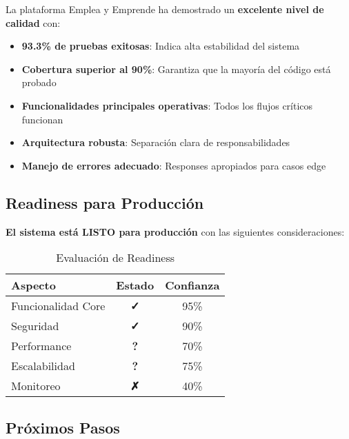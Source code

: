 \documentclass[12pt,a4paper]{article}
\begin{document}
La plataforma Emplea y Emprende ha demostrado un \textcolor{successgreen}{\textbf{excelente nivel de calidad}} con:

\begin{itemize}
    \item \textbf{93.3\% de pruebas exitosas}: Indica alta estabilidad del sistema
    \item \textbf{Cobertura superior al 90\%}: Garantiza que la mayoría del código está probado
    \item \textbf{Funcionalidades principales operativas}: Todos los flujos críticos funcionan
    \item \textbf{Arquitectura robusta}: Separación clara de responsabilidades
    \item \textbf{Manejo de errores adecuado}: Responses apropiados para casos edge
\end{itemize}

\subsection{Readiness para Producción}

\textcolor{successgreen}{\textbf{El sistema está LISTO para producción}} con las siguientes consideraciones:

\begin{table}[H]
\centering
\caption{Evaluación de Readiness}
\begin{tabular}{@{}lcc@{}}
\toprule
\textbf{Aspecto} & \textbf{Estado} & \textbf{Confianza} \\
\midrule
Funcionalidad Core & \textcolor{successgreen}{\textbf{✓}} & 95\% \\
Seguridad & \textcolor{successgreen}{\textbf{✓}} & 90\% \\
Performance & \textcolor{warningyellow}{\textbf{?}} & 70\% \\
Escalabilidad & \textcolor{warningyellow}{\textbf{?}} & 75\% \\
Monitoreo & \textcolor{dangerred}{\textbf{✗}} & 40\% \\
\bottomrule
\end{tabular}
\end{table}

\subsection{Próximos Pasos}
\end{document}
